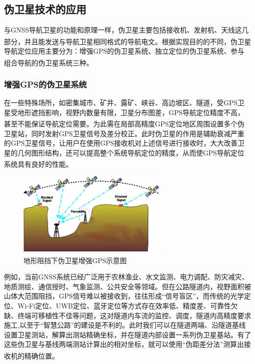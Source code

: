 \documentclass[12pt, a4paper, oneside]{ctexart}
\newcommand{\upcite}[1]{\textsuperscript{\cite{#1}}}
\begin{document}
\subsection{伪卫星技术的应用}

与GNSS导航卫星的功能和原理一样，伪卫星主要包括接收机、发射机、天线这几部分，并且能发送与导航卫星相同格式的导航电文。\upcite{05}根据实现目的的不同，伪卫星导航定位应用主要分为：增强GPS的伪卫星系统、独立定位的伪卫星系统、参与组合导航的伪卫星系统三种。\upcite{002}

\subsubsection{增强GPS的伪卫星系统}

在一些特殊场所，如密集城市、矿井、露矿、峡谷、高边坡区、隧道，受GPS卫星受地形遮挡影响，视野内数量有限，卫星分布图差，GPS导航定位精度不高，甚至不能保证导航定位需要。\upcite{01}为此需在局部高精度GPS定位地区周围设置多个伪卫星站，同时发射GPS卫星信号及差分校正。此时伪卫星的作用是辅助衰减严重的GPS卫星信号，让用户在使用GPS接收机对上述信号进行接收时，大大改善卫星的几何图形结构，还可以提高整个系统导航定位的精度，从而使GPS导航定位系统具有良好的性能。\upcite{002,06}

\begin{figure}[ht]
  \centering
  \includegraphics[width=0.65\textwidth]{img/shiyitu.png}
  \caption{地形阻挡下伪卫星增强GPS示意图\upcite{09}}
  \label{}
\end{figure}

例如，当前GNSS系统已经广泛用于农林渔业、水文监测、电力调配、防灾减灾、地质测绘、通信授时、气象监测、公共安全等领域。但在公路隧道内，视野面积被山体大范围阻挡，GPS信号难以被接收到，往往形成“信号盲区”，而传统的光学定位、Wi-Fi定位、UWB定位、蓝牙定位等方式存在效率低、精度差、可靠性欠缺、终端可移植性不佳等问题，这对隧道内车流的监控、调度，隧道内高精度要求施工,以至于“智慧公路”的建设是不利的。此时我们可以在隧道两端、沿隧道基线设置卫星测站，解算出测站精确坐标，并在隧道内部设置一系列伪卫星基站。有了这些伪卫星与基线两端测站计算出的相对坐标，就可以使用“伪距差分法”测算出接收机的精确位置。\upcite{04,01}
\end{document}
